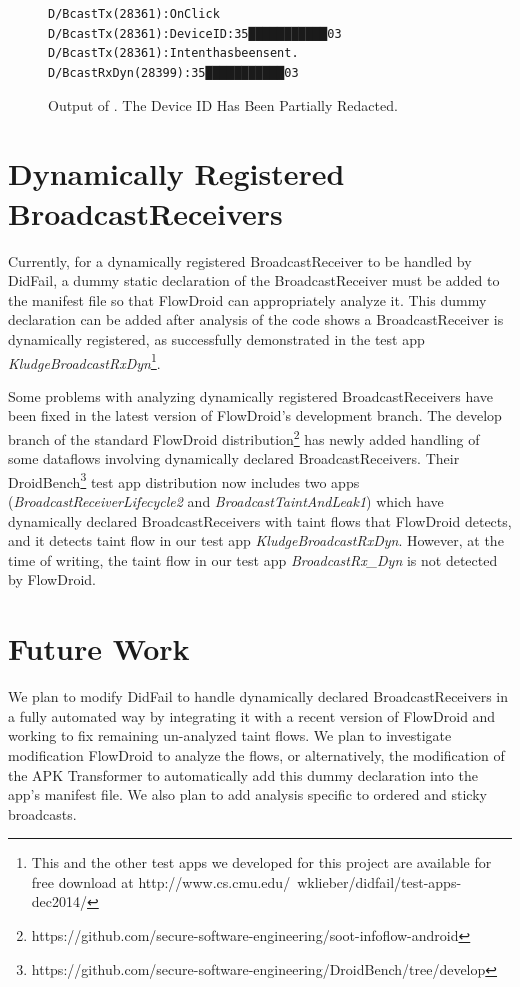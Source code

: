 \begin{figure}[!h]
\begin{framed}
\begin{alltt}
D/BcastTx (28361): OnClick
D/BcastTx (28361): DeviceID: 35███████████03
D/BcastTx (28361): Intent has been sent.
D/BcastRxDyn(28399): 35███████████03
\end{alltt}
\caption[Output of ]{Output of .  The Device ID Has Been Partially Redacted.}
\label{fig:logcat-BcastDyn}
\end{framed}
\end{figure}

\section{Dynamically Registered BroadcastReceivers}
Currently, for a dynamically registered BroadcastReceiver to be handled by DidFail, a dummy static declaration of the BroadcastReceiver must be added to the manifest file so that FlowDroid can appropriately analyze it. This dummy declaration can be added after analysis of the code shows a BroadcastReceiver is dynamically registered, as successfully demonstrated in the test app \textit{KludgeBroadcastRxDyn}\footnote{This and the other test apps we developed for this project are available for free download at http://www.cs.cmu.edu/~wklieber/didfail/test-apps-dec2014/}.

Some problems with analyzing dynamically registered BroadcastReceivers have been fixed in the latest version of FlowDroid’s development branch. The develop branch of the standard FlowDroid distribution\footnote{https://github.com/secure-software-engineering/soot-infoflow-android} has newly added handling of some dataflows involving dynamically declared BroadcastReceivers. Their DroidBench\footnote{https://github.com/secure-software-engineering/DroidBench/tree/develop} test app distribution now includes two apps (\textit{BroadcastReceiverLifecycle2} and \textit{BroadcastTaintAndLeak1}) which have dynamically declared BroadcastReceivers with taint flows that FlowDroid detects, and it detects taint flow in our test app \textit{KludgeBroadcastRxDyn}. However, at the time of writing, the taint flow in our test app \textit{BroadcastRx\_Dyn} is not detected by FlowDroid.

\section{Future Work}
We plan to modify DidFail to handle dynamically declared BroadcastReceivers in a fully automated way by integrating it with a recent version of FlowDroid and working to fix remaining un-analyzed taint flows. We plan to investigate modification FlowDroid to analyze the flows, or alternatively, the modification of the APK Transformer to automatically add this dummy declaration into the app’s manifest file. We also plan to add analysis specific to ordered and sticky broadcasts.


